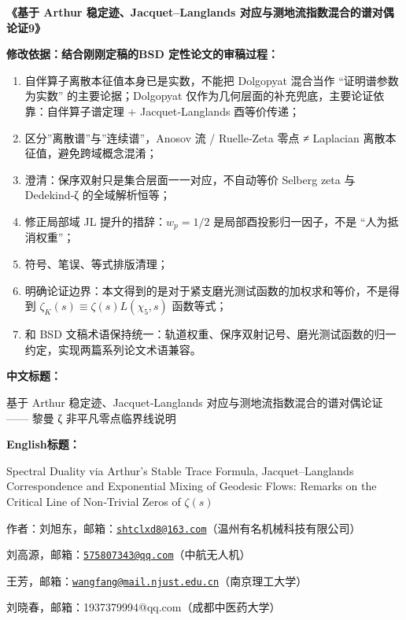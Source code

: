\documentclass[11pt,a4paper]{ctexart}
\begin{document}

\textbf{《基于 Arthur 稳定迹、Jacquet--Langlands
对应与测地流指数混合的谱对偶论证9》}

\textbf{修改依据：结合刚刚定稿的BSD 定性论文的审稿过程：}

\begin{enumerate}
\def\labelenumi{\arabic{enumi}.}
\item
  自伴算子离散本征值本身已是实数，不能把 Dolgopyat 混合当作
  ``证明谱参数为实数'' 的主要论据；Dolgopyat
  仅作为几何层面的补充兜底，主要论证依靠：自伴算子谱定理 +
  Jacquet‑Langlands 酉等价传递；
\item
  区分''离散谱''与''连续谱''，Anosov 流 / Ruelle‑Zeta 零点 ≠ Laplacian
  离散本征值，避免跨域概念混淆；
\item
  澄清：保序双射只是集合层面一一对应，不自动等价 Selberg zeta 与
  Dedekind‑ζ 的全域解析恒等；
\item
  修正局部域 JL 提升的措辞：\(w_{p} = 1/2\) 是局部酉投影归一因子，不是
  ``人为抵消权重''；
\item
  符号、笔误、等式排版清理；
\item
  明确论证边界：本文得到的是对于紧支磨光测试函数的加权求和等价，不是得到
  \(\zeta_{K}(s) \equiv \zeta(s)L\left( \chi_{5},s \right)\) 函数等式；
\item
  和 BSD
  文稿术语保持统一：轨道权重、保序双射记号、磨光测试函数的归一约定，实现两篇系列论文术语兼容。
\end{enumerate}

\textbf{中文标题：}

基于 Arthur 稳定迹、Jacquet‑Langlands 对应与测地流指数混合的谱对偶论证
------ 黎曼 ζ 非平凡零点临界线说明

\textbf{English标题：}

Spectral Duality via Arthur's Stable Trace Formula, Jacquet–Langlands
Correspondence and Exponential Mixing of Geodesic Flows: 
Remarks on the Critical Line of Non‑Trivial Zeros of $\zeta(s)$


作者：刘旭东，邮箱：\href{mailto:shtclxd8@163.com}{\nolinkurl{shtclxd8@163.com}}（温州有名机械科技有限公司）

刘高源，邮箱：\href{mailto:575807343@qq.com}{\nolinkurl{575807343@qq.com}}（中航无人机）

王芳，邮箱：\href{mailto:wangfang@mail.njust.edu.cn}{\nolinkurl{wangfang@mail.njust.edu.cn}}（南京理工大学）

刘晓春，邮箱：1937379994@qq.com（成都中医药大学）
\end{document}

